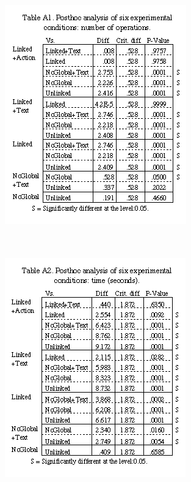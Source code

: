 \documentclass{beamer}
\begin{document}
\begin{frame}
\frametitle{}


\begin{columns}

\centerline{\includegraphics[width=0.500000\linewidth,keepaspectratio]{ky_fg11.png}}

\end{columns}

\end{frame}

\begin{frame}
\frametitle{}


\begin{columns}

\centerline{\includegraphics[width=0.500000\linewidth,keepaspectratio]{ky_fg12.png}}

\end{columns}

\end{frame}
\end{document}
